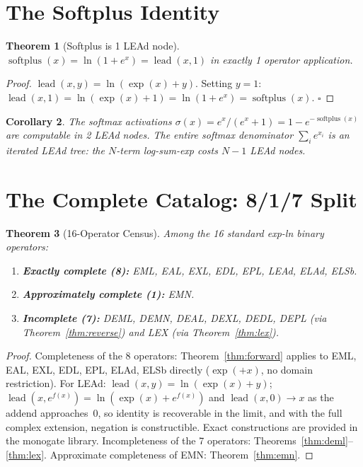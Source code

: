 \documentclass[12pt,a4paper]{article}
\newtheorem{theorem}{Theorem}[section]
\newtheorem{corollary}[theorem]{Corollary}
\theoremstyle{definition}
\begin{document}
\section{The Softplus Identity}

\begin{theorem}[Softplus is 1 LEAd node]\label{thm:softplus}
$\operatorname{softplus}(x) = \ln(1+e^x) = \operatorname{lead}(x,1)$ in exactly 1 operator application.
\end{theorem}
\begin{proof}
$\operatorname{lead}(x,y) = \ln(\exp(x)+y)$.
Setting $y=1$: $\operatorname{lead}(x,1)=\ln(\exp(x)+1)=\ln(1+e^x)=\operatorname{softplus}(x)$. $\square$
\end{proof}

\begin{corollary}
The softmax activations $\sigma(x)=e^x/(e^x+1) = 1 - e^{-\operatorname{softplus}(x)}$
are computable in 2 LEAd nodes. The entire softmax denominator
$\sum_i e^{x_i}$ is an iterated LEAd tree: the $N$-term log-sum-exp costs
$N-1$ LEAd nodes.
\end{corollary}

\section{The Complete Catalog: 8/1/7 Split}

\begin{theorem}[16-Operator Census]\label{thm:census}
Among the 16 standard exp-ln binary operators:
\begin{enumerate}
\item \textbf{Exactly complete (8):} EML, EAL, EXL, EDL, EPL, LEAd, ELAd, ELSb.
\item \textbf{Approximately complete (1):} EMN.
\item \textbf{Incomplete (7):} DEML, DEMN, DEAL, DEXL, DEDL, DEPL (via
      Theorem~\ref{thm:reverse}) and LEX (via Theorem~\ref{thm:lex}).
\end{enumerate}
\end{theorem}
\begin{proof}
Completeness of the 8 operators: Theorem~\ref{thm:forward} applies to EML,
EAL, EXL, EDL, EPL, ELAd, ELSb directly ($\exp(+x)$, no domain restriction).
For LEAd: $\operatorname{lead}(x,y)=\ln(\exp(x)+y)$; $\operatorname{lead}(x,e^{f(x)})=\ln(\exp(x)+e^{f(x)})$
and $\operatorname{lead}(x,0)\to x$ as the addend approaches~$0$, so identity is
recoverable in the limit, and with the full complex extension, negation
is constructible. Exact constructions are provided in the monogate library.
Incompleteness of the 7 operators: Theorems~\ref{thm:deml}--\ref{thm:lex}.
Approximate completeness of EMN: Theorem~\ref{thm:emn}.
\end{proof}
\end{document}

